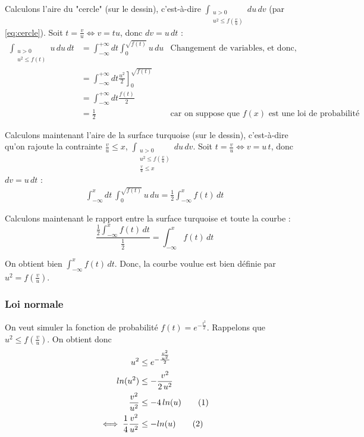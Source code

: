 \newpage

Calculons l'aire du "cercle" (sur le dessin), c'est-à-dire $\int_{\substack{u > 0\\u^2\leq f(\frac{v}{u})}} du\,dv$ (par \eqref{eq:cercle}). Soit $t = \frac{v}{u} \iff v = tu$, donc $dv = u\,dt$ :
\begin{align*}
    \int_{\substack{u > 0\\u^2 \leq f(t)}} u\,du\,dt &= \int_{-\infty}^{+\infty} dt \int_0^{\sqrt{f(t)}} u\,du & \text{Changement de variables, et donc, de bornes}\\
    & = \int_{-\infty}^{+\infty} dt \left. \frac{u^2}{2} \right ]_0^{\sqrt{f(t)}}\\
    & = \int_{-\infty}^{+\infty}dt \frac{f(t)}{2}\\
    & = \frac{1}{2} & \text{car on suppose que $f(x)$ est une loi de probabilité}
\end{align*}

Calculons maintenant l'aire de la surface turquoise (sur le dessin), c'est-à-dire qu'on rajoute la contrainte $\frac{v}{u} \leq x$, $\int_{\substack{u>0\\u^2\leq f(\frac{v}{u})\\\frac{v}{u}\leq x}} du\,dv$. Soit $t = \frac{v}{u} \iff v = u\,t$, donc $dv = u\, dt$ :
\begin{align*}
    \int_{-\infty}^xdt\ \int_0^{\sqrt{f(t)}} u\, du = \frac{1}{2} \int_{-\infty}^x f(t)\,dt
\end{align*}

Calculons maintenant le rapport entre la surface turquoise et toute la courbe :
$$ \frac{\frac{1}{2}\int_{-\infty}^x f(t)\,dt}{\frac{1}{2}} = \int_{-\infty}^x f(t)\,dt$$

On obtient bien $\int_{-\infty}^x f(t)\, dt$. Donc, la courbe voulue est bien définie par $u^2 = f(\frac{v}{u})$.

\subsubsection{Loi normale}
On veut simuler la fonction de probabilité $f(t) = e^{-\frac{t^2}{2}}$. Rappelons que $u^2 \leq f(\frac{v}{u})$. On obtient donc
\begin{align*}
    u^2 &\leq e^{-\frac{\frac{v^2}{u^2}}{2}}\\
    ln(u^2) &\leq -\frac{v^2}{2\,u^2}\\
    \frac{v^2}{u^2} &\leq -4\,ln(u)\stepcounter{equation}\tag{\theequation}\label{eq:vcarreucarre}\\
    \iff \frac{1}{4}\frac{v^2}{u^2} &\leq -ln(u) \stepcounter{equation}\tag{\theequation}\label{eq:quartvcarreucarre}\\
\end{align*}

